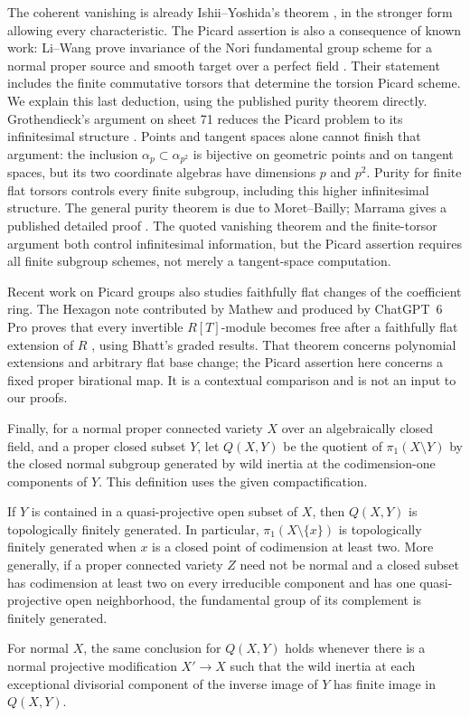 The coherent vanishing is already Ishii--Yoshida's theorem
\cite[Corollary 1.4, p.~3]{IshiiYoshida}, in the stronger form allowing
every characteristic. The Picard assertion is also a consequence of known
work: Li--Wang prove invariance of the Nori fundamental group scheme for
a normal proper source and smooth target over a perfect field
\cite[Corollary 4.6, p.~7]{LiWang}. Their statement includes the finite
commutative torsors that determine the torsion Picard scheme. We explain
this last deduction, using the published purity theorem directly.
Grothendieck's argument on sheet 71 reduces the
Picard problem to its infinitesimal structure \cite{Grothendieck29}. Points and tangent
spaces alone cannot finish that argument: the inclusion
$\alpha_p\subset\alpha_{p^2}$ is bijective on geometric points and
on tangent spaces, but its two coordinate algebras have dimensions
$p$ and $p^2$. Purity for finite flat torsors controls every finite
subgroup, including this higher infinitesimal structure. The general
purity theorem is due to Moret--Bailly; Marrama gives a published
detailed proof \cite[Theorem 6, pp.~433--434]{Marrama}.
The quoted vanishing theorem and the finite-torsor argument both
control infinitesimal information, but the Picard assertion requires
all finite subgroup schemes, not merely a tangent-space computation.

Recent work on Picard groups also studies faithfully flat changes of the
coefficient ring. The Hexagon note contributed by Mathew and produced by
ChatGPT~6 Pro proves that every invertible $R[T]$-module becomes free
after a faithfully flat extension of $R$
\cite[Theorem 1.1, p.~1]{HexagonPicard}, using Bhatt's graded results.
That theorem concerns polynomial extensions and arbitrary flat base
change; the Picard assertion here concerns a fixed proper birational map.
It is a contextual comparison and is not an input to our proofs.

Finally, for a normal proper connected variety $X$ over an algebraically
closed field, and a proper closed subset $Y$, let $Q(X,Y)$ be the
quotient of $\pi_1(X\setminus Y)$ by the closed normal subgroup
generated by wild inertia at the codimension-one components of $Y$.
This definition uses the given compactification.

\begin{theorem}\label{thm:boundary}
If $Y$ is contained in a quasi-projective open subset of $X$, then
$Q(X,Y)$ is topologically finitely generated. In particular,
$\pi_1(X\setminus\{x\})$ is topologically finitely generated when
$x$ is a closed point of codimension at least two. More generally,
if a proper connected variety $Z$ need not be normal and a closed
subset has codimension at least two on every irreducible component
and has one quasi-projective open neighborhood, the fundamental group
of its complement is finitely generated.

For normal $X$, the same conclusion for $Q(X,Y)$ holds whenever
there is a normal projective modification $X'\to X$ such that the
wild inertia at each exceptional divisorial component of the inverse
image of $Y$ has finite image in $Q(X,Y)$.
\end{theorem}

